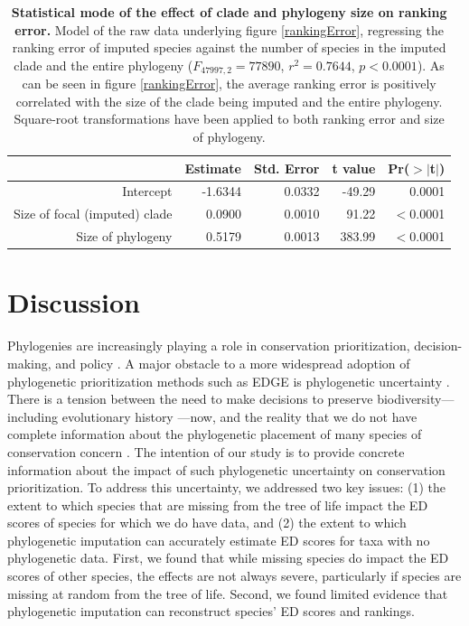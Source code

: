\documentclass[10pt,english]{article}
\begin{document}
\begin{table}[ht]
  \centering
  \begin{tabular}{rrrrr}
    \hline
   & Estimate & Std. Error & t value & Pr($>$$|$t$|$) \\ \hline
    Intercept & -1.6344 & 0.0332 & -49.29 & 0.0001 \\
    Size of focal (imputed) clade & 0.0900 & 0.0010 & 91.22 & $<$0.0001 \\
    Size of phylogeny & 0.5179 & 0.0013 & 383.99 & $<$0.0001 \\ \hline
  \end{tabular}
  \caption{\textbf{Statistical mode of the effect of clade and
      phylogeny size on ranking error.} Model of the raw data
    underlying figure \ref{rankingError}, regressing the ranking error
    of imputed species against the number of species in the imputed
    clade and the entire phylogeny ($F_{47997,2} = 77890$, $r^2 =
    0.7644$, $p <
    0.0001$). As can be seen in figure \ref{rankingError}, the average
    ranking error is positively correlated with the size of the clade
    being imputed and the entire phylogeny.  Square-root
    transformations have been applied to both ranking error and size
    of phylogeny.}
  \label{impute_rank}
\end{table}

\clearpage
\section*{Discussion}
Phylogenies are increasingly playing a role in conservation prioritization,
decision-making, and policy \autocite{Vezquez1998}. A major obstacle to a more
widespread adoption of phylogenetic prioritization methods such as EDGE is
phylogenetic uncertainty \autocite{Collen2015}. There is a tension between the
need to make decisions to preserve biodiversity---including evolutionary history
---now, and the reality that we do not have complete information about the
phylogenetic placement of many species of conservation concern \autocite{Isaac2018}.
The intention of our study is to provide
concrete information about the impact of such phylogenetic uncertainty on
conservation prioritization. To address this uncertainty, we addressed two key
issues: (1) the extent to which species that are missing from the tree of
life impact the ED scores of species for which we do have data, and (2) the
extent to which phylogenetic imputation can accurately estimate ED scores for
taxa with no phylogenetic data. First, we found that while
missing species do impact the ED scores of other species, the effects are not
always severe, particularly if species are missing at random from the tree of
life. Second, we found limited evidence that phylogenetic
imputation can reconstruct species' ED scores and rankings.
\end{document}
